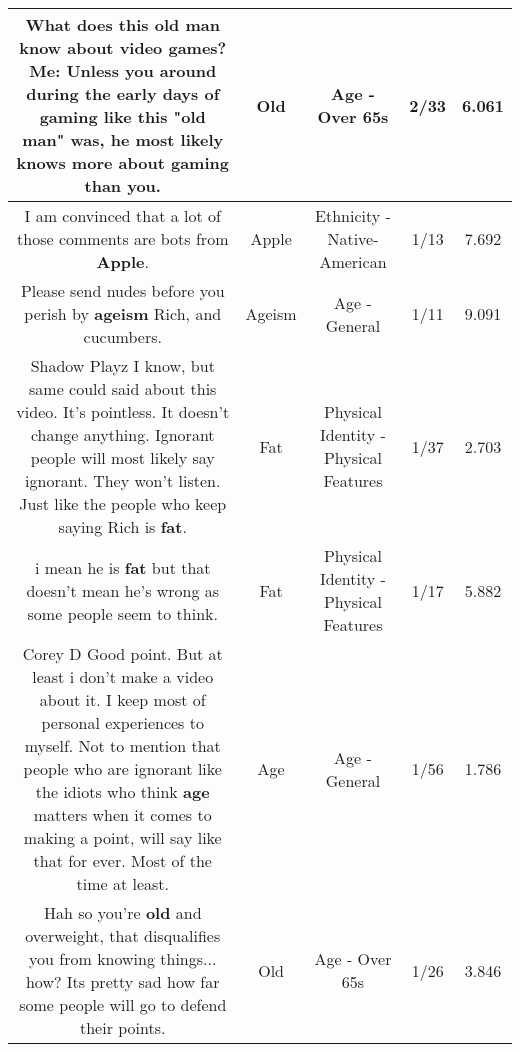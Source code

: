 \documentclass[11pt]{article}
\newlength\mylength
\begin{document}
\begin{center}
\begin{longtable}{|C{.65\mylength}|C{.30\mylength}|C{.12\mylength}|C{.12\mylength}|C{.12\mylength}|}
  \small What does this \textbf{old} man know about video games?Me: Unless you around during the early days of gaming like this "\textbf{old} man" was, he most likely knows more about gaming than you.\normalsize   & Old & Age - Over 65s & 2/33 & 6.061 \\  \hline
  \small I am convinced that a lot of those comments are bots from \textbf{Apple}.\normalsize   & Apple & Ethnicity - Native-American & 1/13 & 7.692 \\  \hline
  \small Please send nudes before you perish by \textbf{ageism} Rich, and cucumbers.\normalsize   & Ageism & Age - General & 1/11 & 9.091 \\  \hline
  \small Shadow  Playz I know, but same could said about this video. It's pointless. It doesn't change anything. Ignorant people will most likely say ignorant. They won't listen. Just like the people who keep saying Rich is \textbf{fat}.\normalsize   & Fat & Physical Identity - Physical Features & 1/37 & 2.703 \\  \hline
  \small i mean he is \textbf{fat} but that doesn't mean he's wrong as some people seem to think.\normalsize   & Fat & Physical Identity - Physical Features & 1/17 & 5.882 \\  \hline
  \small Corey D Good point. But at least i don't make a video about it. I keep most of personal experiences to myself. Not to mention that people who are ignorant like the idiots who think \textbf{age} matters when it comes to making a point, will say like that for ever. Most of the time at least.\normalsize   & Age & Age - General & 1/56 & 1.786 \\  \hline
  \small Hah so you're \textbf{old} and overweight, that disqualifies you from knowing things... how? Its pretty sad how far some people will go to defend their points.\normalsize   & Old & Age - Over 65s & 1/26 & 3.846 \\  \hline

\end{longtable}
\end{center}
\end{document}
